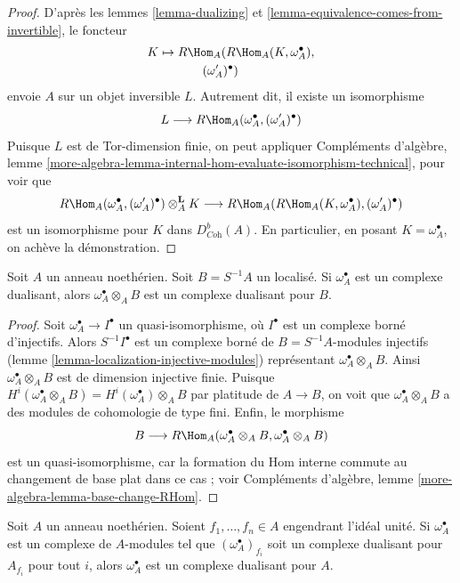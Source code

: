 \begin{proof}
D'après les lemmes \ref{lemma-dualizing} et \ref{lemma-equivalence-comes-from-invertible}, le foncteur
\begin{align*}
K \mapsto {} & R\Hom_A(R\Hom_A(K, \omega_A^\bullet), \\
& \qquad (\omega_A')^\bullet)
\end{align*}
envoie $A$ sur un objet inversible $L$.
Autrement dit, il existe un isomorphisme
$$
L \longrightarrow R\Hom_A(\omega_A^\bullet, (\omega_A')^\bullet)
$$
Puisque $L$ est de Tor-dimension finie, on peut appliquer
Compléments d'algèbre, lemme \ref{more-algebra-lemma-internal-hom-evaluate-isomorphism-technical}, pour voir que
$$
R\Hom_A(\omega_A^\bullet, (\omega'_A)^\bullet) \otimes_A^\mathbf{L} K
\longrightarrow
R\Hom_A(R\Hom_A(K, \omega_A^\bullet), (\omega_A')^\bullet)
$$
est un isomorphisme pour $K$ dans $D^b_{\textit{Coh}}(A)$.
En particulier, en posant $K = \omega_A^\bullet$, on achève la démonstration.
\end{proof}

\begin{lemma}
\label{lemma-dualizing-localize}
Soit $A$ un anneau noethérien. Soit $B = S^{-1}A$ un localisé.
Si $\omega_A^\bullet$ est un complexe dualisant, alors $\omega_A^\bullet \otimes_A B$
est un complexe dualisant pour $B$.
\end{lemma}

\begin{proof}
Soit $\omega_A^\bullet \to I^\bullet$ un quasi-isomorphisme, où $I^\bullet$ est un complexe borné d'injectifs.
Alors $S^{-1}I^\bullet$ est un complexe borné de $B = S^{-1}A$-modules injectifs
(lemme \ref{lemma-localization-injective-modules}) représentant $\omega_A^\bullet \otimes_A B$.
Ainsi $\omega_A^\bullet \otimes_A B$ est de dimension injective finie.
Puisque $H^i(\omega_A^\bullet \otimes_A B) = H^i(\omega_A^\bullet) \otimes_A B$ par platitude de $A \to B$,
on voit que $\omega_A^\bullet \otimes_A B$ a des modules de cohomologie de type fini.
Enfin, le morphisme
$$
B \longrightarrow
R\Hom_A(\omega_A^\bullet \otimes_A B, \omega_A^\bullet \otimes_A B)
$$
est un quasi-isomorphisme, car la formation du Hom interne commute
au changement de base plat dans ce cas ; voir
Compléments d'algèbre, lemme \ref{more-algebra-lemma-base-change-RHom}.
\end{proof}

\begin{lemma}
\label{lemma-dualizing-glue}
Soit $A$ un anneau noethérien. Soient $f_1, \ldots, f_n \in A$ engendrant l'idéal unité.
Si $\omega_A^\bullet$ est un complexe de $A$-modules tel que $(\omega_A^\bullet)_{f_i}$
soit un complexe dualisant pour $A_{f_i}$ pour tout $i$,
alors $\omega_A^\bullet$ est un complexe dualisant pour $A$.
\end{lemma}

